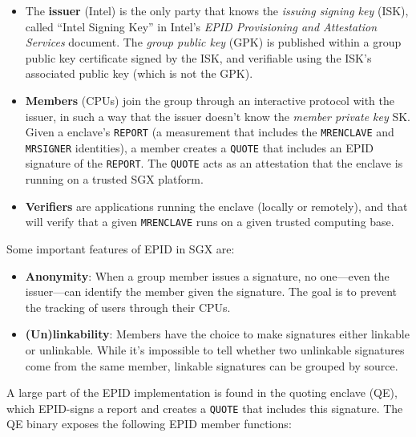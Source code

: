 \documentclass[]{article}
\begin{document}
\begin{itemize}
\item
  The \textbf{issuer} (Intel) is the only party that knows the
  \emph{issuing signing key} (ISK), called ``Intel Signing Key'' in
  Intel's \emph{EPID Provisioning and Attestation Services} document.
  The \emph{group public key} (GPK) is published within a group public
  key certificate signed by the ISK, and verifiable using the ISK's
  associated public key (which is not the GPK).
\item
  \textbf{Members} (CPUs) join the group through an interactive protocol
  with the issuer, in such a way that the issuer doesn't know the
  \emph{member private key} SK. Given a enclave's \texttt{REPORT} (a
  measurement that includes the \texttt{MRENCLAVE} and \texttt{MRSIGNER}
  identities), a member creates a \texttt{QUOTE} that includes an EPID
  signature of the \texttt{REPORT}. The \texttt{QUOTE} acts as an
  attestation that the enclave is running on a trusted SGX platform.
\item
  \textbf{Verifiers} are applications running the enclave (locally or
  remotely), and that will verify that a given \texttt{MRENCLAVE} runs
  on a given trusted computing base.
\end{itemize}

Some important features of EPID in SGX are:

\begin{itemize}
\item
  \textbf{Anonymity}: When a group member issues a signature, no
  one---even the issuer---can identify the member given the signature.
  The goal is to prevent the tracking of users through their CPUs.
\item
  \textbf{(Un)linkability}: Members have the choice to make signatures
  either linkable or unlinkable. While it's impossible to tell whether
  two unlinkable signatures come from the same member, linkable
  signatures can be grouped by source.
\end{itemize}

A large part of the EPID implementation is found in the quoting enclave
(QE), which EPID-signs a report and creates a \texttt{QUOTE} that
includes this signature. The QE binary exposes the following EPID member
functions:
\end{document}
